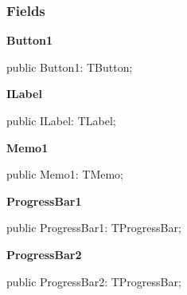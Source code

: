 \documentclass{report}
\newif\ifpdf
\begin{document}
\subsubsection*{\large{\textbf{Fields}}\normalsize\hspace{1ex}\hfill}
\begin{list}{}{
\setlength{\itemindent}{0cm}
\setlength{\listparindent}{0cm}
\setlength{\leftmargin}{\evensidemargin}
\addtolength{\leftmargin}{\tmplength}
\settowidth{\labelsep}{X}
\addtolength{\leftmargin}{\labelsep}
\setlength{\labelwidth}{\tmplength}
}
\label{updexec.TUExecFm-Button1}
\item[\textbf{Button1}\hfill]
\ifpdf
\begin{flushleft}
\fi
\begin{ttfamily}
public Button1: TButton;\end{ttfamily}

\ifpdf
\end{flushleft}
\fi


\par  \label{updexec.TUExecFm-ILabel}
\item[\textbf{ILabel}\hfill]
\ifpdf
\begin{flushleft}
\fi
\begin{ttfamily}
public ILabel: TLabel;\end{ttfamily}

\ifpdf
\end{flushleft}
\fi


\par  \label{updexec.TUExecFm-Memo1}
\item[\textbf{Memo1}\hfill]
\ifpdf
\begin{flushleft}
\fi
\begin{ttfamily}
public Memo1: TMemo;\end{ttfamily}

\ifpdf
\end{flushleft}
\fi


\par  \label{updexec.TUExecFm-ProgressBar1}
\item[\textbf{ProgressBar1}\hfill]
\ifpdf
\begin{flushleft}
\fi
\begin{ttfamily}
public ProgressBar1: TProgressBar;\end{ttfamily}

\ifpdf
\end{flushleft}
\fi


\par  \label{updexec.TUExecFm-ProgressBar2}
\item[\textbf{ProgressBar2}\hfill]
\ifpdf
\begin{flushleft}
\fi
\begin{ttfamily}
public ProgressBar2: TProgressBar;\end{ttfamily}

\ifpdf
\end{flushleft}
\fi


\par  \end{list}
\end{document}
